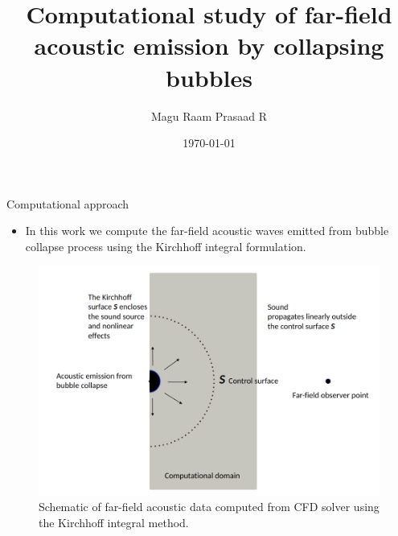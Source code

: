 \documentclass[10pt, aspectratio=169]{beamer}
\title{Computational study of far-field acoustic emission by collapsing bubbles}
\date{\today}
\author[shortname]{Magu Raam Prasaad R}
\institute[shortinst]{Indian Institute of Science, Bangalore}
\begin{document}
\begin{frame}
	\maketitle
\end{frame}

\begin{frame}{Computational approach}
	\begin{itemize}
		\item In this work we compute the far-field acoustic waves emitted from bubble collapse process using the Kirchhoff integral formulation.
	\end{itemize}

	\begin{figure}
		\centering
		\includegraphics[scale=0.22]{images/schematic.png}
		\caption{Schematic of far-field acoustic data computed from CFD solver using the Kirchhoff integral method.}
	\end{figure}
\end{frame}
\end{document}
